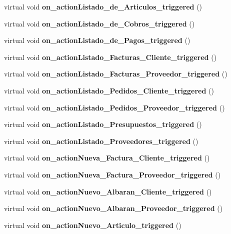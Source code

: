 \begin{CompactItemize}
\item 
virtual void {\bf on\_\-action\-Listado\_\-de\_\-Articulos\_\-triggered} ()\label{classbulmafact_i14}

\item 
virtual void {\bf on\_\-action\-Listado\_\-de\_\-Cobros\_\-triggered} ()\label{classbulmafact_i15}

\item 
virtual void {\bf on\_\-action\-Listado\_\-de\_\-Pagos\_\-triggered} ()\label{classbulmafact_i16}

\item 
virtual void {\bf on\_\-action\-Listado\_\-Facturas\_\-Cliente\_\-triggered} ()\label{classbulmafact_i17}

\item 
virtual void {\bf on\_\-action\-Listado\_\-Facturas\_\-Proveedor\_\-triggered} ()\label{classbulmafact_i18}

\item 
virtual void {\bf on\_\-action\-Listado\_\-Pedidos\_\-Cliente\_\-triggered} ()\label{classbulmafact_i19}

\item 
virtual void {\bf on\_\-action\-Listado\_\-Pedidos\_\-Proveedor\_\-triggered} ()\label{classbulmafact_i20}

\item 
virtual void {\bf on\_\-action\-Listado\_\-Presupuestos\_\-triggered} ()\label{classbulmafact_i21}

\item 
virtual void {\bf on\_\-action\-Listado\_\-Proveedores\_\-triggered} ()\label{classbulmafact_i22}

\item 
virtual void {\bf on\_\-action\-Nueva\_\-Factura\_\-Cliente\_\-triggered} ()\label{classbulmafact_i23}

\item 
virtual void {\bf on\_\-action\-Nueva\_\-Factura\_\-Proveedor\_\-triggered} ()\label{classbulmafact_i24}

\item 
virtual void {\bf on\_\-action\-Nuevo\_\-Albaran\_\-Cliente\_\-triggered} ()\label{classbulmafact_i25}

\item 
virtual void {\bf on\_\-action\-Nuevo\_\-Albaran\_\-Proveedor\_\-triggered} ()\label{classbulmafact_i26}

\item 
virtual void {\bf on\_\-action\-Nuevo\_\-Articulo\_\-triggered} ()\label{classbulmafact_i27}


\end{CompactItemize}
